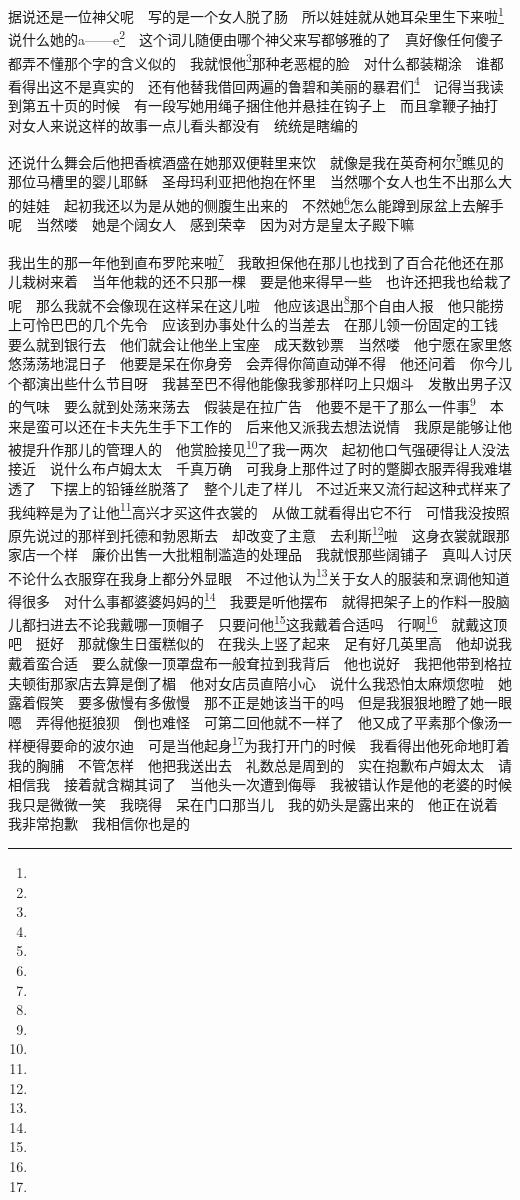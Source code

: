 \par 据说还是一位神父呢　写的是一个女人脱了肠　所以娃娃就从她耳朵里生下来啦\footnote{}　说什么她的a——e\footnote{}　这个词儿随便由哪个神父来写都够雅的了　真好像任何傻子都弄不懂那个字的含义似的　我就恨他\footnote{}那种老恶棍的脸　对什么都装糊涂　谁都看得出这不是真实的　还有他替我借回两遍的鲁碧和美丽的暴君们\footnote{}　记得当我读到第五十页的时候　有一段写她用绳子捆住他并悬挂在钩子上　而且拿鞭子抽打　对女人来说这样的故事一点儿看头都没有　统统是瞎编的　
\par 还说什么舞会后他把香槟酒盛在她那双便鞋里来饮　就像是我在英奇柯尔\footnote{}瞧见的那位马槽里的婴儿耶稣　圣母玛利亚把他抱在怀里　当然哪个女人也生不出那么大的娃娃　起初我还以为是从她的侧腹生出来的　不然她\footnote{}怎么能蹲到尿盆上去解手呢　当然喽　她是个阔女人　感到荣幸　因为对方是皇太子殿下嘛　
\par 我出生的那一年他到直布罗陀来啦\footnote{}　我敢担保他在那儿也找到了百合花他还在那儿栽树来着　当年他栽的还不只那一棵　要是他来得早一些　也许还把我也给栽了呢　那么我就不会像现在这样呆在这儿啦　他应该退出\footnote{}那个自由人报　他只能捞上可怜巴巴的几个先令　应该到办事处什么的当差去　在那儿领一份固定的工钱　要么就到银行去　他们就会让他坐上宝座　成天数钞票　当然喽　他宁愿在家里悠悠荡荡地混日子　他要是呆在你身旁　会弄得你简直动弹不得　他还问着　你今儿个都演出些什么节目呀　我甚至巴不得他能像我爹那样叼上只烟斗　发散出男子汉的气味　要么就到处荡来荡去　假装是在拉广告　他要不是干了那么一件事\footnote{}　本来是蛮可以还在卡夫先生手下工作的　后来他又派我去想法说情　我原是能够让他被提升作那儿的管理人的　他赏脸接见\footnote{}了我一两次　起初他口气强硬得让人没法接近　说什么布卢姆太太　千真万确　可我身上那件过了时的蹩脚衣服弄得我难堪透了　下摆上的铅锤丝脱落了　整个儿走了样儿　不过近来又流行起这种式样来了　我纯粹是为了让他\footnote{}高兴才买这件衣裳的　从做工就看得出它不行　可惜我没按照原先说过的那样到托德和勃恩斯去　却改变了主意　去利斯\footnote{}啦　这身衣裳就跟那家店一个样　廉价出售一大批粗制滥造的处理品　我就恨那些阔铺子　真叫人讨厌　不论什么衣服穿在我身上都分外显眼　不过他认为\footnote{}关于女人的服装和烹调他知道得很多　对什么事都婆婆妈妈的\footnote{}　我要是听他摆布　就得把架子上的作料一股脑儿都扫进去不论我戴哪一顶帽子　只要问他\footnote{}这我戴着合适吗　行啊\footnote{}　就戴这顶吧　挺好　那就像生日蛋糕似的　在我头上竖了起来　足有好几英里高　他却说我戴着蛮合适　要么就像一顶罩盘布一般耷拉到我背后　他也说好　我把他带到格拉夫顿街那家店去算是倒了楣　他对女店员直陪小心　说什么我恐怕太麻烦您啦　她露着假笑　要多傲慢有多傲慢　那不正是她该当干的吗　但是我狠狠地瞪了她一眼　嗯　弄得他挺狼狈　倒也难怪　可第二回他就不一样了　他又成了平素那个像汤一样梗得要命的波尔迪　可是当他起身\footnote{}为我打开门的时候　我看得出他死命地盯着我的胸脯　不管怎样　他把我送出去　礼数总是周到的　实在抱歉布卢姆太太　请相信我　接着就含糊其词了　当他头一次遭到侮辱　我被错认作是他的老婆的时候　我只是微微一笑　我晓得　呆在门口那当儿　我的奶头是露出来的　他正在说着　我非常抱歉　我相信你也是的　
